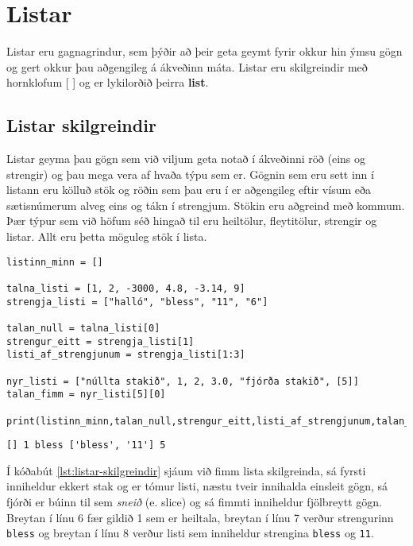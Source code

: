 
\chapter{Listar}\label{k:listar}
Listar eru gagnagrindur, sem þýðir að þeir geta geymt fyrir okkur hin ýmsu gögn og gert okkur þau aðgengileg á ákveðinn máta.
Listar eru skilgreindir með hornklofum [ ] og er lykilorðið þeirra \textbf{list}.

\section{Listar skilgreindir}\label{uk:listar-skilgreindir}
Listar geyma þau gögn sem við viljum geta notað í ákveðinni röð (eins og strengir) og þau mega vera af hvaða týpu sem er.
Gögnin sem eru sett inn í listann eru kölluð stök og röðin sem þau eru í er aðgengileg eftir vísum eða sætisnúmerum alveg eins og tákn í strengjum.
Stökin eru aðgreind með kommum.
Þær týpur sem við höfum séð hingað til eru heiltölur, fleytitölur, strengir og listar.
Allt eru þetta möguleg stök í lista.

\begin{lstlisting}[caption=Listar skilgreindir, label=lst:listar-skilgreindir]
listinn_minn = []

talna_listi = [1, 2, -3000, 4.8, -3.14, 9]
strengja_listi = ["halló", "bless", "11", "6"]

talan_null = talna_listi[0]
strengur_eitt = strengja_listi[1]
listi_af_strengjunum = strengja_listi[1:3]

nyr_listi = ["núllta stakið", 1, 2, 3.0, "fjórða stakið", [5]]
talan_fimm = nyr_listi[5][0]

print(listinn_minn,talan_null,strengur_eitt,listi_af_strengjunum,talan_fimm)
\end{lstlisting}
\lstset{style=uttak}
\begin{lstlisting}
[] 1 bless ['bless', '11'] 5
\end{lstlisting}
\lstset{style=venjulegt}

Í kóðabút \ref{lst:listar-skilgreindir} sjáum við fimm lista skilgreinda, sá fyrsti inniheldur ekkert stak og er tómur listi, næstu tveir innihalda einsleit gögn, sá fjórði er búinn til sem \textit{sneið} (e. slice) og sá fimmti inniheldur fjölbreytt gögn.
Breytan í línu 6 fær gildið 1 sem er heiltala, breytan í línu 7 verður strengurinn \texttt{bless} og breytan í línu 8 verður listi sem inniheldur strengina \texttt{bless} og \texttt{11}.

